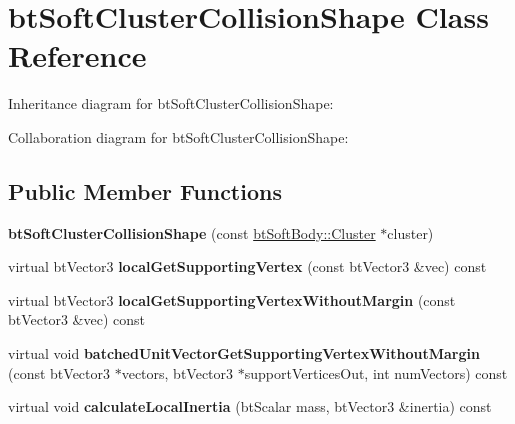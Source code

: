 \hypertarget{classbt_soft_cluster_collision_shape}{\section{bt\+Soft\+Cluster\+Collision\+Shape Class Reference}
\label{classbt_soft_cluster_collision_shape}
}


Inheritance diagram for bt\+Soft\+Cluster\+Collision\+Shape\+:


Collaboration diagram for bt\+Soft\+Cluster\+Collision\+Shape\+:
\subsection*{Public Member Functions}
\begin{DoxyCompactItemize}
\item 
\hypertarget{classbt_soft_cluster_collision_shape_a13945afba7d058ce5838dcc19a5239fb}{{\bfseries bt\+Soft\+Cluster\+Collision\+Shape} (const \hyperlink{structbt_soft_body_1_1_cluster}{bt\+Soft\+Body\+::\+Cluster} $\ast$cluster)}\label{classbt_soft_cluster_collision_shape_a13945afba7d058ce5838dcc19a5239fb}

\item 
\hypertarget{classbt_soft_cluster_collision_shape_a83fa917b18103407b69f52bf9ce4e614}{virtual bt\+Vector3 {\bfseries local\+Get\+Supporting\+Vertex} (const bt\+Vector3 \&vec) const }\label{classbt_soft_cluster_collision_shape_a83fa917b18103407b69f52bf9ce4e614}

\item 
\hypertarget{classbt_soft_cluster_collision_shape_aa2965c1c07b10822939dec1e5c259859}{virtual bt\+Vector3 {\bfseries local\+Get\+Supporting\+Vertex\+Without\+Margin} (const bt\+Vector3 \&vec) const }\label{classbt_soft_cluster_collision_shape_aa2965c1c07b10822939dec1e5c259859}

\item 
\hypertarget{classbt_soft_cluster_collision_shape_a63f179ed47e4f51f4b11eb00184c6811}{virtual void {\bfseries batched\+Unit\+Vector\+Get\+Supporting\+Vertex\+Without\+Margin} (const bt\+Vector3 $\ast$vectors, bt\+Vector3 $\ast$support\+Vertices\+Out, int num\+Vectors) const }\label{classbt_soft_cluster_collision_shape_a63f179ed47e4f51f4b11eb00184c6811}

\item 
\hypertarget{classbt_soft_cluster_collision_shape_ad66053a35cc780da404cfa971e3dabef}{virtual void {\bfseries calculate\+Local\+Inertia} (bt\+Scalar mass, bt\+Vector3 \&inertia) const }\label{classbt_soft_cluster_collision_shape_ad66053a35cc780da404cfa971e3dabef}


\end{DoxyCompactItemize}
